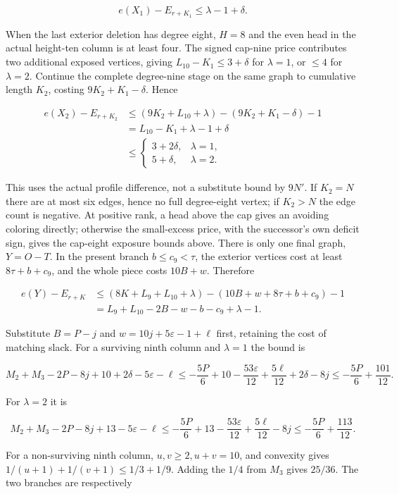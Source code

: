 \documentclass[11pt,a4paper]{article}
\theoremstyle{definition}
\begin{document}
\[
 e(X_1)-E_{r+K_1}\le\lambda-1+\delta.
\]

When the last exterior deletion has degree eight, $H=8$ and the even head in the actual height-ten column is at least four. The signed cap-nine price contributes two additional exposed vertices, giving $L_{10}-K_1\le3+\delta$ for $\lambda=1$, or $\le4$ for $\lambda=2$. Continue the complete degree-nine stage on the same graph to cumulative length $K_2$, costing $9K_2+K_1-\delta$. Hence

\begin{align*}
 e(X_2)-E_{r+K_2}
 &\le(9K_2+L_{10}+\lambda)-(9K_2+K_1-\delta)-1\\
 &=L_{10}-K_1+\lambda-1+\delta\\
 &\le\begin{cases}3+2\delta,&\lambda=1,\\5+\delta,&\lambda=2.\end{cases}
\end{align*}

This uses the actual profile difference, not a substitute bound by $9N'$. If $K_2=N$ there are at most six edges, hence no full degree-eight vertex; if $K_2>N$ the edge count is negative. At positive rank, a head above the cap gives an avoiding coloring directly; otherwise the small-excess price, with the successor's own deficit sign, gives the cap-eight exposure bounds above.
There is only one final graph, $Y=O-T$. In the present branch $b\le c_9<\tau$, the exterior vertices cost at least $8\tau+b+c_9$, and the whole piece costs $10B+w$. Therefore

\begin{align*}
 e(Y)-E_{r+K}
 &\le(8K+L_9+L_{10}+\lambda)-(10B+w+8\tau+b+c_9)-1\\
 &=L_9+L_{10}-2B-w-b-c_9+\lambda-1.
\end{align*}

Substitute $B=P-j$ and $w=10j+5\varepsilon-1+\ell$ first, retaining the cost of matching slack. For a surviving ninth column and $\lambda=1$ the bound is

\[
 M_2+M_3-2P-8j+10+2\delta-5\varepsilon-\ell
 \le-\frac{5P}{6}+10-\frac{53\varepsilon}{12}
      +\frac{5\ell}{12}+2\delta-8j
 \le-\frac{5P}{6}+\frac{101}{12}.
\]

For $\lambda=2$ it is

\[
 M_2+M_3-2P-8j+13-5\varepsilon-\ell
 \le-\frac{5P}{6}+13-\frac{53\varepsilon}{12}
       +\frac{5\ell}{12}-8j
 \le-\frac{5P}{6}+\frac{113}{12}.
\]

For a non-surviving ninth column, $u,v\ge2,u+v=10$, and convexity gives $1/(u+1)+1/(v+1)\le1/3+1/9$. Adding the $1/4$ from $M_3$ gives $25/36$. The two branches are respectively
\end{document}
